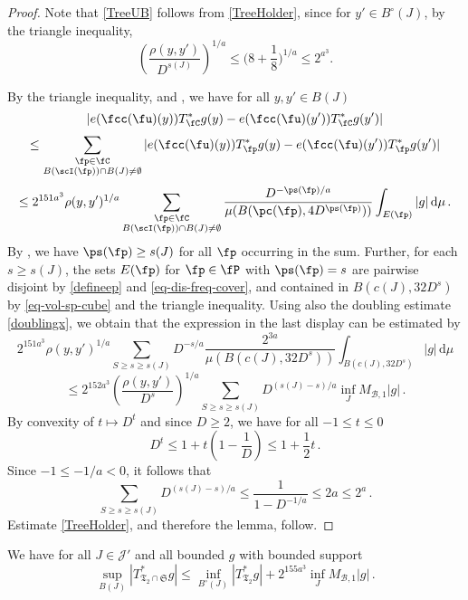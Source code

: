     \begin{proof}
        Note that \eqref{TreeUB} follows from \eqref{TreeHolder}, since for $y'\in B^\circ{}(J)$, by the triangle inequality,
        $$\left(\frac{\rho(y,y')}{D^{s(J)}}\right)^{1/a}\le \Big(8 + \frac{1}8\Big)^{1/a}\le 2^{a^3}.$$

        By the triangle inequality,  and , we have for all $y, y' \in B(J)$
        \begin{equation}
            \label{eq-C-Lip}
            |e(\fcc(\fu)(y)) T_{\fC}^* g(y) - e(\fcc(\fu)(y')) T_{\fC}^* g(y')|
        \end{equation}
        $$
            \leq \sum_{\substack{\fp \in \fC\\ B(\scI(\fp)) \cap B(J) \neq \emptyset}} |e(\fcc(\fu)(y)) T_{\fp}^* g(y) - e(\fcc(\fu)(y')) T_{\fp}^* g(y')|
        $$
        $$
            \le 2^{151a^3}\rho(y,y')^{1/a} \sum_{\substack{\fp \in \fC\\ B(\scI(\fp)) \cap B(J) \neq \emptyset}} \frac{D^{- \ps(\fp)/a}}{\mu(B(\pc(\fp), 4D^{\ps(\fp)}))} \int_{E(\fp)} |g| \, \mathrm{d}\mu\,.
        $$
        By , we have $\ps(\fp) \ge s(J)$ for all $\fp$ occurring in the sum. Further, for each $s \ge s(J)$, the sets $E(\fp)$ for $\fp \in \fP$ with $\ps(\fp) = s$ are pairwise disjoint by \eqref{defineep} and \eqref{eq-dis-freq-cover}, and contained in $B(c(J), 32D^{s})$ by \eqref{eq-vol-sp-cube} and the triangle inequality. Using also the doubling estimate \eqref{doublingx}, we obtain that the expression in the last display can be estimated by
        $$
            2^{151a^3}\rho(y,y')^{1/a} \sum_{S \ge s \ge s(J)} D^{-s/a} \frac{2^{3a}}{\mu(B(c(J), 32D^{s}))} \int_{B(c(J), 32D^{s})} |g| \, \mathrm{d}\mu
        $$
        $$
            \le 2^{152a^3} \left(\frac{\rho(y,y')}{D^s}\right)^{1/a} \sum_{S \ge s \ge s(J)} D^{(s(J) - s)/a} \inf_J M_{\mathcal{B},1} |g|\,.
        $$
        By convexity of $t \mapsto D^t$ and since $D \ge 2$, we have for all $-1 \le t \le 0$
        $$
            D^t \le 1 + t(1 - \frac{1}{D}) \le 1 + \frac{1}{2}t\,.
        $$
        Since $-1 \le -1/a <0$, it follows that
        $$
            \sum_{S \ge s \ge s(J)} D^{(s(J) - s)/a} \le \frac{1}{1 - D^{-1/a}} \le 2a \le 2^a\,.
        $$
        Estimate \eqref{TreeHolder}, and therefore the lemma, follow.
    \end{proof}

    \begin{lemma}
        \label{global-tree-control-2}
        We have for all $J \in \mathcal{J}'$ and all bounded $g$ with bounded support
        $$
            \sup_{B(J)} |T^*_{\mathfrak{T}_2 \cap \mathfrak{S}} g| \le \inf_{B^\circ{}(J)} |T^*_{\mathfrak{T}_2} g| + 2^{155a^3} \inf_{J} M_{\mathcal{B},1}|g|\,.
        $$
    \end{lemma}

